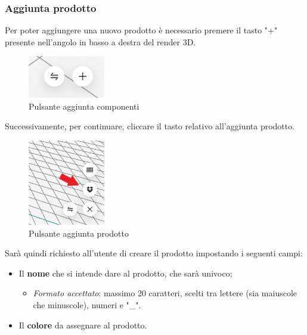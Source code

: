         \subsubsection{Aggiunta prodotto}\label{sec:prodotti:aggiunta}
        Per poter aggiungere una nuovo prodotto è necessario premere il tasto "+" presente nell'angolo in basso a destra del render 3D.\\
        \begin{figure}[h!]
            \centering
            \includegraphics[width=0.3\textwidth]{images/aggiunta_spostamenti.png}
            \caption{Pulsante aggiunta componenti}
        \end{figure}
        
        \noindent Successivamente, per continuare, cliccare il tasto relativo all'aggiunta prodotto.\\
        \begin{figure}[h!]
            \centering
            \includegraphics[width=0.3\textwidth]{images/aggiunta_prodotto.png}
            \caption{Pulsante aggiunta prodotto}
        \end{figure}

        \noindent Sarà quindi richiesto all'utente di creare il prodotto impostando i seguenti campi:
        \begin{itemize}
            \item Il \textbf{nome} che si intende dare al prodotto, che sarà univoco;
                \begin{itemize}
                        \item \textit{Formato accettato}: massimo 20 caratteri, scelti tra lettere (sia maiuscole che minuscole), numeri e "\_".
                \end{itemize}
            \item Il \textbf{colore} da assegnare al prodotto.
        \end{itemize}
        
